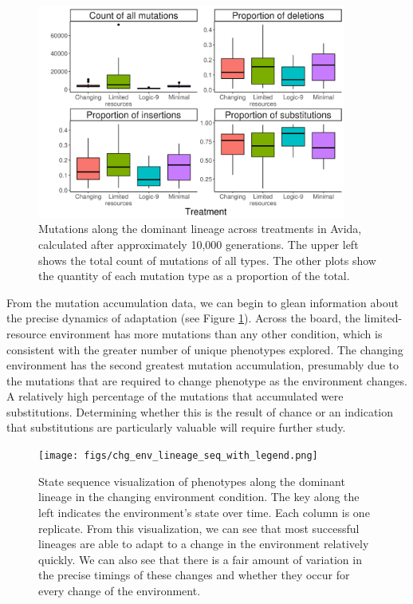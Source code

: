 \documentclass[letterpaper]{article}
\newcommand{\reduceCaptionPadding}{\setlength{\belowcaptionskip}{-10pt}}
\begin{document}
\begin{figure}
    \centering
    \includegraphics[width=4in]{figs/mutations_avida.png}
    \caption{\small Mutations along the dominant lineage across treatments in Avida, calculated after approximately 10,000 generations. The upper left shows the total count of mutations of all types. The other plots show the quantity of each mutation type as a proportion of the total.}
    \label{fig:avida_mutation}
\end{figure}


From the mutation accumulation data, we can begin to glean information about the precise dynamics of adaptation (see Figure \ref{fig:avida_mutation}). Across the board, the limited-resource environment has more mutations than any other condition, which is consistent with the greater number of unique phenotypes explored. The changing environment has the second greatest mutation accumulation, presumably due to the mutations that are required to change phenotype as the environment changes. A relatively high percentage of the mutations that accumulated were substitutions. Determining whether this is the result of chance or an indication that substitutions are particularly valuable will require further study. 


\begin{figure}
\centering
\texttt{[image: figs/chg\_env\_lineage\_seq\_with\_legend.png]}
\reduceCaptionPadding
\caption{\small State sequence visualization of phenotypes along the dominant lineage in the changing environment condition. The key along the left indicates the environment's state over time. Each column is one replicate. From this visualization, we can see that most successful lineages are able to adapt to a change in the environment relatively quickly. We can also see that there is a fair amount of variation in the precise timings of these changes and whether they occur for every change of the environment.}
\label{fig:stateseq}
\end{figure}
\end{document}
